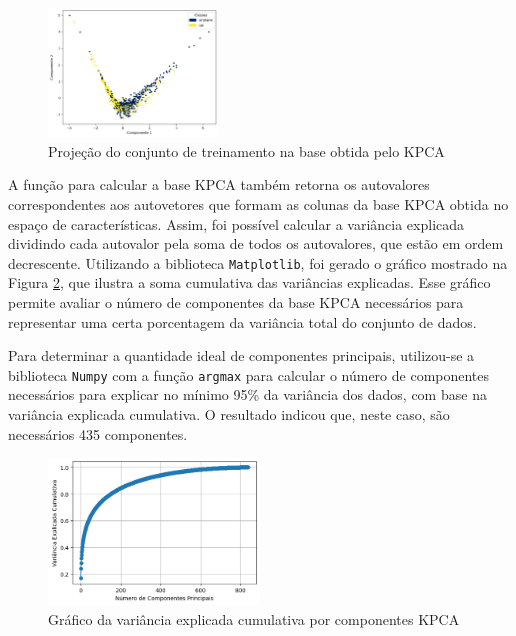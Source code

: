 \documentclass[]{abntex2}
\begin{document}
\begin{figure}[H]
    \centering 
    \includegraphics[width=0.4\textwidth]{imgs/ex1/KPCA.png}
    \caption{Projeção do conjunto de treinamento na base obtida pelo KPCA}
    \label{fig:KPCA} %
\end{figure}

A função para calcular a base KPCA também retorna os autovalores correspondentes aos autovetores que formam as colunas da base KPCA obtida no espaço de características. Assim, foi possível calcular a variância explicada dividindo cada autovalor pela soma de todos os autovalores, que estão em ordem decrescente. Utilizando a biblioteca \texttt{Matplotlib}, foi gerado o gráfico mostrado na Figura \ref{fig:vari_kpca}, que ilustra a soma cumulativa das variâncias explicadas. Esse gráfico permite avaliar o número de componentes da base KPCA necessários para representar uma certa porcentagem da variância total do conjunto de dados.

Para determinar a quantidade ideal de componentes principais, utilizou-se a biblioteca \texttt{Numpy} com a função \texttt{argmax} para calcular o número de componentes necessários para explicar no mínimo 95\% da variância dos dados, com base na variância explicada cumulativa. O resultado indicou que, neste caso, são necessários 435 componentes.

\begin{figure}[H]
    \centering 
    \includegraphics[width=0.5\textwidth]{imgs/ex1/vari_kpca.png}
    \caption{Gráfico da variância explicada cumulativa por componentes KPCA}
    \label{fig:vari_kpca} %
\end{figure}
\end{document}
